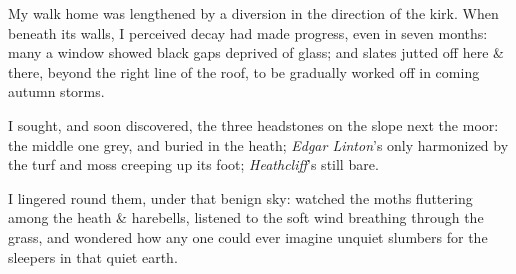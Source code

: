 \documentclass[MAIN]{subfiles}
\begin{document}
My walk home was lengthened by a diversion in the direction of the kirk.  When beneath its walls, I perceived decay had made progress, even in seven months: many a window showed black gaps deprived of glass; and slates jutted off here \& there, beyond the right line of the roof, to be gradually worked off in coming autumn storms.

I sought, and soon discovered, the three headstones on the slope next the moor: the middle one grey, and  buried in the heath; \emph{Edgar Linton}'s only harmonized by the turf and moss creeping up its foot; \emph{Heathcliff}'s still bare.

I lingered round them, under that benign sky: watched the moths fluttering among the heath \& harebells, listened to the soft wind breathing through the grass, and wondered how any one could ever imagine unquiet slumbers for the sleepers in that quiet earth.
\end{document}
